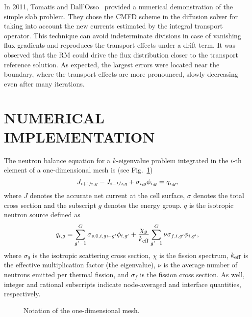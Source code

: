 \documentclass[letterpaper]{physor2020}
\newcommand{\keff}{{\ensuremath{k_{\textrm{\scriptsize{eff}}}}}}
\newcommand{\hzi}{\ensuremath{\sfrac{1}{2}}}
\begin{document}
In 2011, Tomatis and Dall'Osso~\cite{Tomatis-2011} provided a numerical demonstration of the simple slab problem. They chose the CMFD scheme in the diffusion solver for taking into account the new currents estimated by the integral transport operator.
%
%
This technique can avoid indeterminate divisions in case of vanishing flux gradients and reproduces the transport effects under a drift term. It was observed that the RM could drive the flux distribution closer to the transport reference solution. As expected, the largest errors were located near the boundary, where the transport effects are more pronounced, slowly decreasing even after many iterations.%


\section{NUMERICAL IMPLEMENTATION}
\label{sec:RM-num}

The neutron balance equation for a $k$-eigenvalue problem integrated in the $i$-th element of a one-dimensional mesh is (see Fig.~\ref{fig:mesh1D})
\begin{equation}
  \label{eq:balance}
  J_{i+\hzi,g} - J_{i-\hzi,g} + \sigma_{i,g} \phi_{i,g} = q_{i,g},
\end{equation}
where $J$ denotes the accurate net current at the cell surface, $\sigma$ denotes the total cross section and the subscript $g$ denotes the energy group. $q$ is the isotropic neutron source defined as
\begin{equation}
  \label{eq:qsrc}
  q_{i,g} = \sum\limits_{g'=1}^G\sigma_{s,0,i,g\leftarrow g'}\phi_{i,g'} +
  \frac{\chi_g}{\keff}\sum\limits_{g'=1}^G\nu\sigma_{f,i,g'}\phi_{i,g'},
\end{equation}
where $\sigma_0$ is the isotropic scattering cross section, $\chi$ is the fission spectrum, $\keff$ is the effective multiplication factor (the eigenvalue), $\nu$ is the average number of neutrons emitted per thermal fission, and $\sigma_f$ is the fission cross section. As well, integer and rational subscripts indicate node-averaged and interface quantities, respectively.
%
\begin{figure}[htbp]
	\centering
  
	\caption{Notation of the one-dimensional mesh.}
	\label{fig:mesh1D}
\end{figure}
\end{document}

